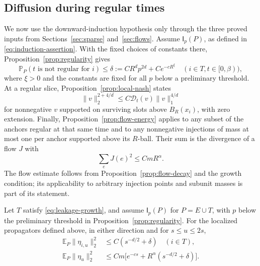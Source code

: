\subsection{Diffusion during regular times}

We now use the downward-induction hypothesis only through the three
proved inputs from Sections~\ref{sec:sparse} and~\ref{sec:flows}.
Assume $\mathsf I_p(P)$, as defined in
\eqref{eq:induction-assertion}.  With the fixed choices of constants
there, Proposition~\ref{prop:regularity} gives
\begin{equation}\label{eq:leakage-delta}
 \mathbb P_P(t\text{ is not regular for }i)
       \le\delta:=C R^d p^{2d}+C e^{-cR^\xi}
       \quad(i\in T, t\in[0,\beta)),
\end{equation}
where $\xi>0$ and the constants are fixed for all $p$ below a
preliminary threshold.  At a regular slice,
Proposition~\ref{prop:local-nash} states
\begin{equation}\label{eq:leakage-nash-input}
 \|v\|_2^{2+4/d}\le C\mathcal D_t(v)\|v\|_1^{4/d}
\end{equation}
for nonnegative $v$ supported on surviving slots above $B_R(x_i)$,
with zero extension.  Finally, Proposition~\ref{prop:flow-energy}
applies to any subset of the anchors regular at that same time and to
any nonnegative injections of mass at most one per anchor supported
above its $R$-ball.  Their sum is the divergence of a flow $J$ with
\begin{equation}\label{eq:leakage-flow-input}
                   \sum_e J(e)^2\le C mR^\alpha.
\end{equation}
The flow estimate follows from Proposition~\ref{prop:flow-decay} and
the growth condition; its applicability to arbitrary injection points
and subunit masses is part of its statement.

\begin{lemma}\label{lem:regular-time-decay}
Let $T$ satisfy \eqref{eq:leakage-growth}, and assume
$\mathsf I_p(P)$ for $P=E\cup T$, with $p$ below the preliminary
threshold in Proposition~\ref{prop:regularity}.  For the localized
propagators defined above, in either direction and for
$s\le u\le2s$,
\begin{align}
 \mathbb E_P\|\eta_{i,u}\|_2^2
       &\le C(s^{-d/2}+\delta)\quad(i\in T),
                    \label{eq:piece-decay}\\
 \mathbb E_P\|\eta_u\|_2^2
       &\le C m\bigl[e^{-cs}+R^\alpha(s^{-d/2}+\delta)\bigr].
                    \label{eq:all-pieces-decay}
\end{align}
\end{lemma}

